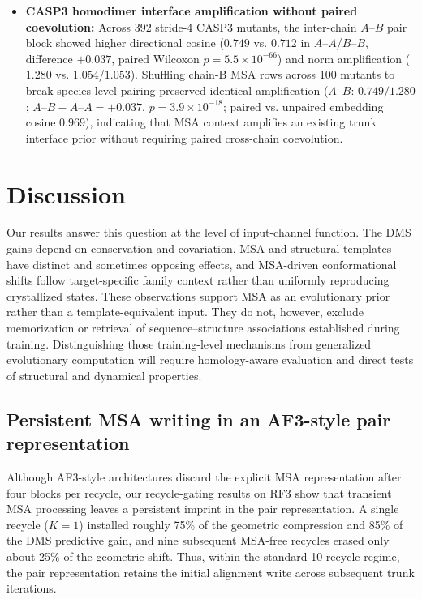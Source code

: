 \documentclass[10pt,a4paper]{article}
\begin{document}
\begin{itemize}
    \item \textbf{CASP3 homodimer interface amplification without paired coevolution:} Across 392 stride-4 CASP3 mutants, the inter-chain $A\text{--}B$ pair block showed higher directional cosine ($0.749$ vs. $0.712$ in $A\text{--}A$/$B\text{--}B$, difference $+0.037$, paired Wilcoxon $p = 5.5 \times 10^{-66}$) and norm amplification ($1.280$ vs. $1.054$/$1.053$). Shuffling chain-B MSA rows across 100 mutants to break species-level pairing preserved identical amplification ($A\text{--}B$: $0.749 / 1.280$; $A\text{--}B - A\text{--}A = +0.037$, $p = 3.9 \times 10^{-18}$; paired vs. unpaired embedding cosine $0.969$), indicating that MSA context amplifies an existing trunk interface prior without requiring paired cross-chain coevolution.
\end{itemize}

\section{Discussion}

Our results answer this question at the level of input-channel function. The DMS gains depend on conservation and covariation, MSA and structural templates have distinct and sometimes opposing effects, and MSA-driven conformational shifts follow target-specific family context rather than uniformly reproducing crystallized states. These observations support MSA as an evolutionary prior rather than a template-equivalent input. They do not, however, exclude memorization or retrieval of sequence--structure associations established during training. Distinguishing those training-level mechanisms from generalized evolutionary computation will require homology-aware evaluation and direct tests of structural and dynamical properties.

\subsection{Persistent MSA writing in an AF3-style pair representation}
Although AF3-style architectures discard the explicit MSA representation after four blocks per recycle, our recycle-gating results on RF3 show that transient MSA processing leaves a persistent imprint in the pair representation. A single recycle ($K=1$) installed roughly 75\% of the geometric compression and 85\% of the DMS predictive gain, and nine subsequent MSA-free recycles erased only about 25\% of the geometric shift. Thus, within the standard 10-recycle regime, the pair representation retains the initial alignment write across subsequent trunk iterations.
\end{document}
